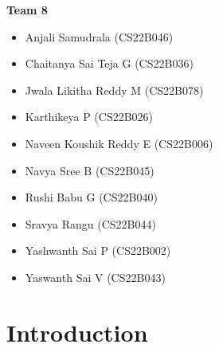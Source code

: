 \documentclass[12pt]{article}
\begin{document}
\begin{center}
    \noindent \textbf{Team 8}
    \begin{multicols}{2}
        \begin{itemize}
            \item Anjali Samudrala (CS22B046)
            \item Chaitanya Sai Teja G (CS22B036)
            \item Jwala Likitha Reddy M (CS22B078)
            \item Karthikeya P (CS22B026)
            \item Naveen Koushik Reddy E (CS22B006)
            \item Navya Sree B (CS22B045)
            \item Rushi Babu G (CS22B040)
            \item Sravya Rangu (CS22B044)
            \item Yashwanth Sai P (CS22B002)
            \item Yaswanth Sai V (CS22B043)
        \end{itemize}
    \end{multicols}
    \vspace{0.5cm}

\end{center}
\clearpage

\section{Introduction}
\end{document}
